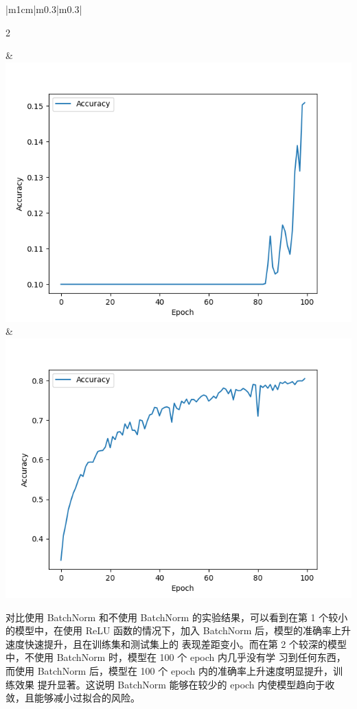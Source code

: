 \documentclass{article}%
\begin{document}
\begin{table}[H]
\begin{tabular}{|m{1cm}|m{0.3\linewidth}|m{0.3\linewidth}|}
        \begin{center} 2 \end{center}  &\vspace{5pt} \includegraphics[width=1\linewidth]{Acc_4.5.png} &\vspace{5pt} \includegraphics[width=1\linewidth]{Acc_5.png} \\[0.6cm]
        \hline
    \end{tabular}
    \caption{是否使用BatchNorm——Accuracy曲线}
\end{table}


对比使用 BatchNorm 和不使用 BatchNorm 的实验结果，可以看到在第 1 个较小的模型中，在使用
ReLU 函数的情况下，加入 BatchNorm 后，模型的准确率上升速度快速提升，且在训练集和测试集上的
表现差距变小。而在第 2 个较深的模型中，不使用 BatchNorm 时，模型在 100 个 epoch 内几乎没有学
习到任何东西，而使用 BatchNorm 后，模型在 100 个 epoch 内的准确率上升速度明显提升，训练效果
提升显著。这说明 BatchNorm 能够在较少的 epoch 内使模型趋向于收敛，且能够减小过拟合的风险。
\end{document}
